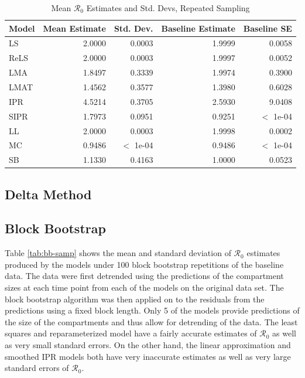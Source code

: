 \documentclass[12pt]{article}
\newcommand{\rr}{\ensuremath{\mathcal{R}_0}}
\begin{document}
\begin{table}[H]
	
	\centering
	\begin{tabular}[t]{l|r|r|r|r}
		\hline
		Model & Mean Estimate & Std. Dev. & Baseline Estimate & Baseline SE\\
		\hline
		LS & 2.0000 & 0.0003 & 1.9999 & 0.0058\\
		\hline
		ReLS & 2.0000 & 0.0003 & 1.9997 & 0.0052\\
		\hline
		LMA & 1.8497 & 0.3339 & 1.9974 & 0.3900\\
		\hline
		LMAT & 1.4562 & 0.3577 & 1.3980 & 0.6028 \\
		\hline
		IPR & 4.5214 & 0.3705 & 2.5930 & 9.0408\\
		\hline
		SIPR & 1.7973 & 0.0951 & 0.9251 & $<$ 1e-04 \\
		\hline
		LL & 2.0000 & 0.0003 & 1.9998 & 0.0002\\
		\hline
		MC & 0.9486 & $<$ 1e-04 & 0.9486 & $<$ 1e-04\\
		\hline
		SB & 1.1330 & 0.4163 & 1.0000 & 0.0523\\
		\hline
	\end{tabular}
        \caption{Mean $\rr$ Estimates and Std. Devs, Repeated Sampling}
        \label{tab:rep-samp}
\end{table}

\subsection{Delta Method}

\subsection{Block Bootstrap}

Table \ref{tab:bb-samp} shows the mean and standard deviation of $\rr$ estimates produced by the models under 100 block bootstrap repetitions of the baseline data. The data were first detrended using the predictions of the compartment sizes at each time point from each of the models on the original data set. The block bootstrap algorithm was then applied on to the residuals from the predictions using a fixed block length. Only 5 of the models provide predictions of the size of the compartments and thus allow for detrending of the data. The least squares and reparameterized model have a fairly accurate estimates of $\rr$ as well as very small standard errors. On the other hand, the linear approximation and smoothed IPR models both have very inaccurate estimates as well as very large standard errors of $\rr$.
\end{document}
